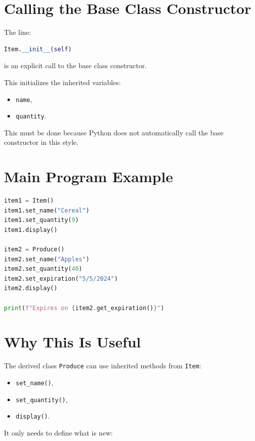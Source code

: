 \documentclass[11pt]{article}
\begin{document}
\section{Calling the Base Class Constructor}

The line:

\begin{lstlisting}[language=Python]
Item.__init__(self)
\end{lstlisting}

is an explicit call to the base class constructor.

This initializes the inherited variables:

\begin{itemize}
    \item \texttt{name},
    \item \texttt{quantity}.
\end{itemize}

This must be done because Python does not automatically call the base constructor in this style.

\section{Main Program Example}

\begin{lstlisting}[language=Python]
item1 = Item()
item1.set_name("Cereal")
item1.set_quantity(9)
item1.display()

item2 = Produce()
item2.set_name("Apples")
item2.set_quantity(40)
item2.set_expiration("5/5/2024")
item2.display()

print(f"Expires on {item2.get_expiration()}")
\end{lstlisting}

\section{Why This Is Useful}

The derived class \texttt{Produce} can use inherited methods from \texttt{Item}:

\begin{itemize}
    \item \texttt{set\_name()},
    \item \texttt{set\_quantity()},
    \item \texttt{display()}.
\end{itemize}

It only needs to define what is new:
\end{document}
